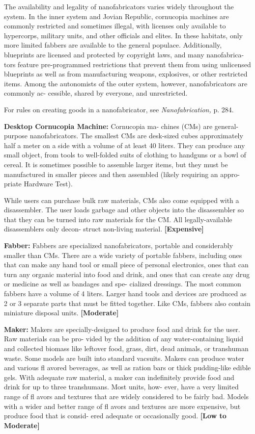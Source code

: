 The availability and legality of nanofabricators 
varies widely throughout the system. In the inner 
system and Jovian Republic, cornucopia machines 
are commonly restricted and sometimes illegal, with 
licenses only available to hypercorps, military units, 
and other officials and elites. In these habitats, only 
more limited fabbers are available to the general 
populace. Additionally, blueprints are licensed and 
protected by copyright laws, and many nanofabrica-
tors feature pre-programmed restrictions that prevent 
them from using unlicensed blueprints as well as 
from manufacturing weapons, explosives, or other 
restricted items. Among the autonomists of the outer 
system, however, nanofabricators are commonly ac-
cessible, shared by everyone, and unrestricted.

For rules on creating goods in a nanofabricator, see 
\textit{Nanofabrication,} p. 284.

\textbf{Desktop Cornucopia Machine:} Cornucopia ma-
chines (CMs) are general-purpose nanofabricators. 
The smallest CMs are desk-sized cubes approximately 
half a meter on a side with a volume of at least 40 
liters. They can produce any small object, from tools 
to well-folded suits of clothing to handguns or a bowl 
of cereal. It is sometimes possible to assemble larger 
items, but they must be manufactured in smaller 
pieces and then assembled (likely requiring an appro-
priate Hardware Test).

While users can purchase bulk raw materials, CMs 
also come equipped with a disassembler. The user 
loads garbage and other objects into the disassembler 
so that they can be turned into raw materials for the 
CM. All legally-available disassemblers only decon-
struct non-living material. \textbf{[Expensive]}

\textbf{Fabber:} Fabbers are specialized nanofabricators, 
portable and considerably smaller than CMs. There 
are a wide variety of portable fabbers, including 
ones that can make any hand tool or small piece of 
personal electronics, ones that can turn any organic 
material into food and drink, and ones that can create 
any drug or medicine as well as bandages and spe-
cialized dressings. The most common fabbers have a 
volume of 4 liters. Larger hand tools and devices are 
produced as 2 or 3 separate parts that must be fitted 
together. Like CMs, fabbers also contain miniature 
disposal units. \textbf{[Moderate]}

\textbf{Maker:} Makers are specially-designed to produce 
food and drink for the user. Raw materials can be pro-
vided by the addition of any water-containing liquid 
and collected biomass like leftover food, grass, dirt, 
dead animals, or transhuman waste. Some models are 
built into standard vacsuits. Makers can produce water 
and various fl avored beverages, as well as ration bars 
or thick pudding-like edible gels. With adequate raw 
material, a maker can indefinitely provide food and 
drink for up to three transhumans. Most units, how-
ever, have a very limited range of fl avors and textures 
that are widely considered to be fairly bad. Models 
with a wider and better range of fl avors and textures 
are more expensive, but produce food that is consid-
ered adequate or occasionally good. \textbf{[Low to Moderate]}

